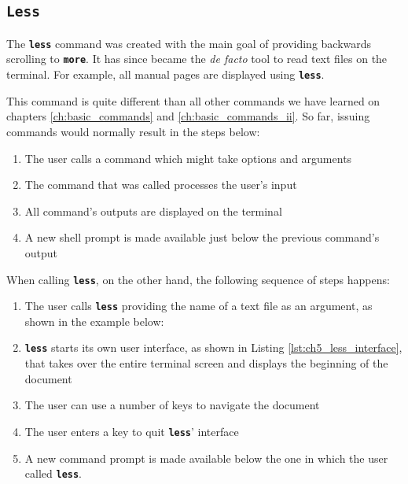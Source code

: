 \subsection{\textbf{\texttt{Less}}}

The \textbf{\texttt{less}} command was created with the main goal of providing backwards scrolling to \textbf{\texttt{more}}. It has since became the \textit{de facto} tool to read text files on the terminal. For example, all manual pages are displayed using \textbf{\texttt{less}}.

This command is quite different than all other commands we have learned on chapters \ref{ch:basic_commands} and \ref{ch:basic_commands_ii}. So far, issuing commands would normally result in the steps below:
\begin{enumerate}
\item The user calls a command which might take options and arguments
\item The command that was called processes the user's input
\item All command's outputs are displayed on the terminal
\item A new shell prompt is made available just below the previous command's output
\end{enumerate}

When calling \textbf{\texttt{less}}, on the other hand, the following sequence of steps happens:

\begin{enumerate}
\item The user calls \textbf{\texttt{less}} providing the name of a text file as an argument, as shown in the example below:
\item \textbf{\texttt{less}} starts its own user interface, as shown in Listing \ref{lst:ch5_less_interface}, that takes over the entire terminal screen and displays the beginning of the document
\item The user can use a number of keys to navigate the document
\item The user enters a key to quit \textbf{\texttt{less}}' interface
\item A new command prompt is made available below the one in which the user called \textbf{\texttt{less}}.
\end{enumerate}

